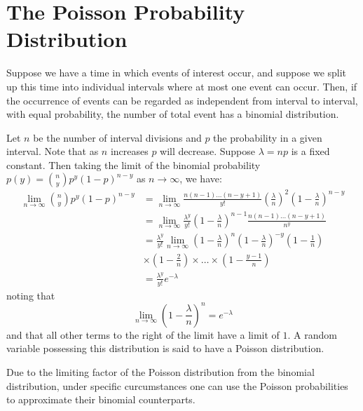 \documentclass[12pt, a4paper, twoside, openright, titlepage]{book}
\begin{document}
\section{\textsection The Poisson Probability Distribution}


\begin{cons}{}{}
    Suppose we have a time in which events of interest occur, and suppose we split up this time into individual intervals where at most one event can occur. Then, if the occurrence of events can be regarded as independent from interval to interval, with equal probability, the number of total event has a binomial distribution.


    Let $n$ be the number of interval divisions and $p$ the probability in a given interval. Note that as $n$ increases $p$ will decrease. Suppose $\lambda = np$ is a fixed constant. Then taking the limit of the binomial probability $p(y) = \binom{n}{y}p^y(1-p)^{n-y}$ as $n \rightarrow \infty$, we have: \begin{align*}
        \lim\limits_{n\rightarrow \infty}\binom{n}{y}p^y(1-p)^{n-y} &= \lim\limits_{n\rightarrow\infty}\frac{n(n-1)\hdots(n-y+1)}{y!}\left(\frac{\lambda}{n}\right)^2\left(1-\frac{\lambda}{n}\right)^{n-y} \\
        &= \lim\limits_{n\rightarrow \infty}\frac{\lambda^y}{y!}\left(1-\frac{\lambda}{n}\right)^{n-1}\frac{n(n-1)\hdots(n-y+1)}{n^y} \\
        &= \frac{\lambda^y}{y!} \lim\limits_{n\rightarrow \infty}\left(1-\frac{\lambda}{n}\right)^n\left(1-\frac{\lambda}{n}\right)^{-y}\left(1-\frac{1}{n}\right) \\
        &\times \left(1-\frac{2}{n}\right)\times \hdots \times \left(1-\frac{y-1}{n}\right) \\
        &= \frac{\lambda^y}{y!}e^{-\lambda}
    \end{align*}
    noting that \begin{equation*}
        \lim\limits_{n\rightarrow \infty}\left(1-\frac{\lambda}{n}\right)^n = e^{-\lambda}
    \end{equation*}
    and that all other terms to the right of the limit have a limit of $1$. A random variable possessing this distribution is said to have a Poisson distribution.
\end{cons}


Due to the limiting factor of the Poisson distribution from the binomial distribution, under specific curcumstances one can use the Poisson probabilities to approximate their binomial counterparts.
\end{document}
